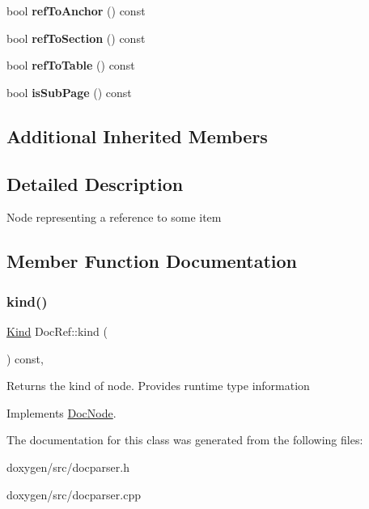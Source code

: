 \begin{DoxyCompactItemize}
\mbox{\label{class_doc_ref_aac58be3cf79d893f928d00006a082d35}} 
bool {\bfseries ref\+To\+Anchor} () const
\item 
\mbox{\label{class_doc_ref_ae6fd639341aca7aa93aba2d50f0ff874}} 
bool {\bfseries ref\+To\+Section} () const
\item 
\mbox{\label{class_doc_ref_a7f42be6ae37c6e1cfebab418fe6c50c7}} 
bool {\bfseries ref\+To\+Table} () const
\item 
\mbox{\label{class_doc_ref_a722c091f3305523016b5608a5bb9ccdf}} 
bool {\bfseries is\+Sub\+Page} () const
\end{DoxyCompactItemize}
\subsection*{Additional Inherited Members}


\subsection{Detailed Description}
Node representing a reference to some item 

\subsection{Member Function Documentation}
\mbox{\label{class_doc_ref_a0790bb1c3794fa63436fa73192ef4e1c}} 
\subsubsection{\texorpdfstring{kind()}{kind()}}
{\footnotesize\ttfamily \mbox{\hyperlink{class_doc_node_aebd16e89ca590d84cbd40543ea5faadb}{Kind}} Doc\+Ref\+::kind (\begin{DoxyParamCaption}{ }\end{DoxyParamCaption}) const\hspace{0.3cm}{\ttfamily [inline]}, {\ttfamily [virtual]}}

Returns the kind of node. Provides runtime type information 

Implements \mbox{\hyperlink{class_doc_node_a108ffd214a72ba6e93dac084a8f58049}{Doc\+Node}}.



The documentation for this class was generated from the following files\+:\begin{DoxyCompactItemize}
\item 
doxygen/src/docparser.\+h\item 
doxygen/src/docparser.\+cpp\end{DoxyCompactItemize}
